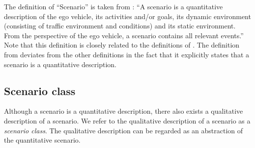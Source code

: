 %	

The definition of ``Scenario'' is taken from \textcite{elrofai2018scenario}: ``A scenario is a quantitative description of the ego vehicle, its activities and/or goals, its dynamic environment (consisting of traffic environment and conditions) and its static environment. From the perspective of the ego vehicle, a scenario contains all relevant events.'' 
Note that this definition is closely related to the definitions of \textcite{geyer2014, ulbrich2015, elrofai2016scenario}. The definition from \textcite{elrofai2018scenario} deviates from the other definitions in the fact that it explicitly states that a scenario is a quantitative description. 



\subsection{Scenario class}
\label{sec:scenario class}

Although a scenario is a quantitative description, there also exists a qualitative description of a scenario. We refer to the qualitative description of a scenario as a \emph{scenario class}. The qualitative description can be regarded as an abstraction of the quantitative scenario.

